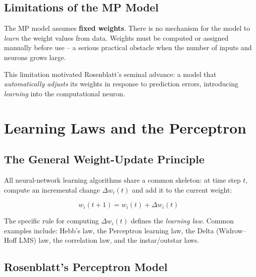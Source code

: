 \documentclass[12pt,a4paper]{article}
\begin{document}
\subsection{Limitations of the MP Model}
\label{subsec:mp-limits}

\begin{warningbox}[title=Critical Limitation of the MP Model]
The MP model assumes \textbf{fixed weights}.
There is no mechanism for the model to \emph{learn} the weight values
from data.
Weights must be computed or assigned manually before use -- a serious
practical obstacle when the number of inputs and neurons grows large.
\end{warningbox}

This limitation motivated Rosenblatt's seminal advance: a model that
\emph{automatically adjusts} its weights in response to prediction
errors, introducing \emph{learning} into the computational neuron.

\section{Learning Laws and the Perceptron}
\label{sec:perceptron}

\subsection{The General Weight-Update Principle}
\label{subsec:weight-update}

All neural-network learning algorithms share a common skeleton:
at time step $t$, compute an incremental change $\Delta w_i(t)$ and
add it to the current weight:

\begin{equation}
  w_i(t+1) = w_i(t) + \Delta w_i(t)
  \label{eq:weight-update}
\end{equation}

The specific rule for computing $\Delta w_i(t)$ defines the
\emph{learning law}.
Common examples include: Hebb's law, the Perceptron learning law,
the Delta (Widrow--Hoff LMS) law, the correlation law, and the
instar/outstar laws.

\subsection{Rosenblatt's Perceptron Model}
\label{subsec:perceptron-model}
\end{document}
